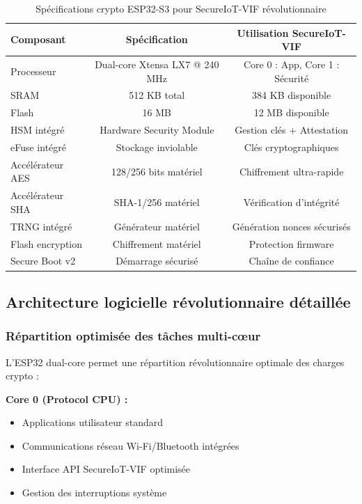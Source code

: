 \begin{table}[h]
\centering
\caption{Spécifications crypto ESP32-S3 pour SecureIoT-VIF révolutionnaire}
\label{tab:esp32-crypto-specs}
\begin{tabular}{|l|c|c|}
\hline
\textbf{Composant} & \textbf{Spécification} & \textbf{Utilisation SecureIoT-VIF} \\
\hline
Processeur & Dual-core Xtensa LX7 @ 240 MHz & Core 0 : App, Core 1 : Sécurité \\
SRAM & 512 KB total & 384 KB disponible \\
Flash & 16 MB & 12 MB disponible \\
HSM intégré & Hardware Security Module & Gestion clés + Attestation \\
eFuse intégré & Stockage inviolable & Clés cryptographiques \\
Accélérateur AES & 128/256 bits matériel & Chiffrement ultra-rapide \\
Accélérateur SHA & SHA-1/256 matériel & Vérification d'intégrité \\
TRNG intégré & Générateur matériel & Génération nonces sécurisés \\
Flash encryption & Chiffrement matériel & Protection firmware \\
Secure Boot v2 & Démarrage sécurisé & Chaîne de confiance \\
\hline
\end{tabular}
\end{table}

\subsection{Architecture logicielle révolutionnaire détaillée}

\subsubsection{Répartition optimisée des tâches multi-cœur}

L'ESP32 dual-core permet une répartition révolutionnaire optimale des charges crypto :

\textbf{Core 0 (Protocol CPU) :}
\begin{itemize}
    \item Applications utilisateur standard
    \item Communications réseau Wi-Fi/Bluetooth intégrées
    \item Interface API SecureIoT-VIF optimisée
    \item Gestion des interruptions système
\end{itemize}

